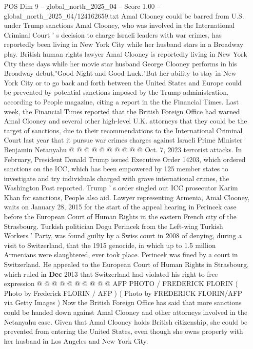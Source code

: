 \begin{textsample}{POS Dim 9 – global\_north\_2025\_04 – Score 1.00 – global\_north\_2025\_04/124162659.txt}  \label{ex:f9_pos_422}
Amal Clooney could be barred from U.S. under Trump sanctions Amal Clooney, who was involved in the International Criminal Court ' s decision to charge Israeli leaders with war crimes, has reportedly been living in New York City while her husband stars in a Broadway play.
British human rights lawyer Amal Clooney is reportedly living in New York City these days while her movie star husband George Clooney performs in his Broadway debut,"Good Night and Good Luck."But her ability to stay in New York City or to go back and forth between the United States and Europe could be prevented by potential sanctions imposed by the Trump administration, according to People magazine, citing a report in the the Financial Times.
Last week, the Financial Times reported that the British Foreign Office had warned Amal Clooney and several other high-level U.K. attorneys that they could be the target of sanctions, due to their recommendations to the International Criminal Court last year that it pursue war crimes charges against Israeli Prime Minister Benjamin Netanyahu @ @ @ @ @ @ @ @ @ @ Oct. 7, 2023 terrorist attacks.
In February, President Donald Trump issued Executive Order 14203, which ordered sanctions on the ICC, which has been empowered by 125 member states to investigate and try individuals charged with grave international crimes, the Washington Post reported.
Trump ' s order singled out ICC prosecutor Karim Khan for sanctions, People also aid.
Lawyer representing Armenia, Amal Clooney, waits on January 28, 2015 for the start of the appeal hearing in Perincek case before the European Court of Human Rights in the eastern French city of the Strasbourg.
Turkish politician Dogu Perincek from the Left-wing Turkish Workers ' Party, was found guilty by a Swiss court in 2008 of denying, during a visit to Switzerland, that the 1915 genocide, in which up to 1.5 million Armenians were slaughtered, ever took place.
Perincek was fined by a court in Switzerland.
He appealed to the European Court of Human Rights in Strasbourg, which ruled in \textbf{Dec} 2013 that Switzerland had violated his right to free expression @ @ @ @ @ @ @ @ @ @ AFP PHOTO / FREDERICK FLORIN ( Photo by Frederick FLORIN / AFP ) ( Photo by FREDERICK FLORIN/AFP via Getty Images ) Now the British Foreign Office has said that more sanctions could be handed down against Amal Clooney and other attorneys involved in the Netanyahu case.
Given that Amal Clooney holds British citizenship, she could be prevented from entering the United States, even though she owns property with her husband in Los Angeles and New York City.

\end{textsample}
